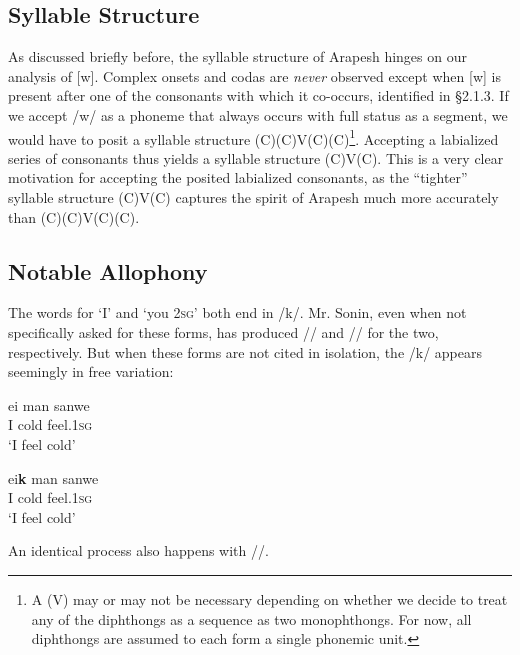 \documentclass[pdftex,12pt,letterpaper]{article}
\let\ipa\textipa
\begin{document}
 \subsection{Syllable Structure}

 As discussed briefly before, the syllable structure of Arapesh hinges on our analysis of [w]. Complex onsets and codas are \emph{never} observed except when [w] is present after one of the consonants with which it co-occurs, identified in \S 2.1.3. If we accept /w/ as a phoneme that always occurs with full status as a segment,  we would have to posit a syllable structure (C)(C)V(C)(C)\footnote{A (V) may or may not be necessary depending on whether we decide to treat any of the diphthongs as a sequence as two monophthongs. For now, all diphthongs are assumed to each form a single phonemic unit.}. Accepting a labialized series of consonants thus yields a syllable structure (C)V(C). This is a very clear motivation for accepting the posited labialized consonants, as the ``tighter'' syllable structure (C)V(C) captures the spirit of Arapesh much more accurately than (C)(C)V(C)(C).

 \subsection{Notable Allophony}

 The words for `I' and `you \textsc{2sg}' both end in /k/. Mr. Sonin, even when not specifically asked for these forms, has produced /\ipa{eik}/ and /\ipa{\textltailn@k}/ for the two, respectively. But when these forms are not cited in isolation, the /k/ appears seemingly in free variation:

 \begin{minipage}{\textwidth}
 \begin{exe}
 \ex
 \gll ei man\ipa{@g@s} sanwe \\
 I cold feel.\textsc{1sg} \\
 \trans `I feel cold'

 \ex
 \gll ei\textbf{k} man\ipa{@g@s} sanwe \\
 I cold feel.\textsc{1sg} \\
 \trans `I feel cold'
 \end{exe}
 \vspace{10pt}
 \end{minipage}

 \noindent An identical process also happens with /\ipa{\textltailn@k}/.
\end{document}
